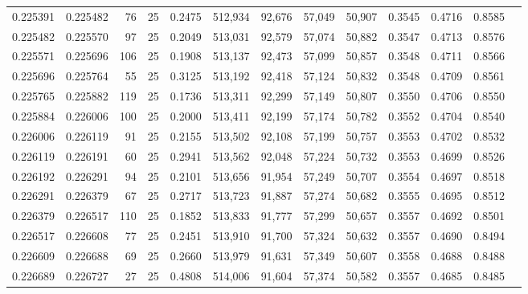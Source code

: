 \begin{tabular}{rrrrrrrrrrrrr}
0.225391 & 0.225482 &    76 &  25 &                                     0.2475 & 512,934 &  92,676 &  57,049 &  50,907 & 0.3545 & 0.4716 & 0.8585 \\
0.225482 & 0.225570 &    97 &  25 &                                     0.2049 & 513,031 &  92,579 &  57,074 &  50,882 & 0.3547 & 0.4713 & 0.8576 \\
0.225571 & 0.225696 &   106 &  25 &                                     0.1908 & 513,137 &  92,473 &  57,099 &  50,857 & 0.3548 & 0.4711 & 0.8566 \\
0.225696 & 0.225764 &    55 &  25 &                                     0.3125 & 513,192 &  92,418 &  57,124 &  50,832 & 0.3548 & 0.4709 & 0.8561 \\
0.225765 & 0.225882 &   119 &  25 &                                     0.1736 & 513,311 &  92,299 &  57,149 &  50,807 & 0.3550 & 0.4706 & 0.8550 \\
0.225884 & 0.226006 &   100 &  25 &                                     0.2000 & 513,411 &  92,199 &  57,174 &  50,782 & 0.3552 & 0.4704 & 0.8540 \\
0.226006 & 0.226119 &    91 &  25 &                                     0.2155 & 513,502 &  92,108 &  57,199 &  50,757 & 0.3553 & 0.4702 & 0.8532 \\
0.226119 & 0.226191 &    60 &  25 &                                     0.2941 & 513,562 &  92,048 &  57,224 &  50,732 & 0.3553 & 0.4699 & 0.8526 \\
0.226192 & 0.226291 &    94 &  25 &                                     0.2101 & 513,656 &  91,954 &  57,249 &  50,707 & 0.3554 & 0.4697 & 0.8518 \\
0.226291 & 0.226379 &    67 &  25 &                                     0.2717 & 513,723 &  91,887 &  57,274 &  50,682 & 0.3555 & 0.4695 & 0.8512 \\
0.226379 & 0.226517 &   110 &  25 &                                     0.1852 & 513,833 &  91,777 &  57,299 &  50,657 & 0.3557 & 0.4692 & 0.8501 \\
0.226517 & 0.226608 &    77 &  25 &                                     0.2451 & 513,910 &  91,700 &  57,324 &  50,632 & 0.3557 & 0.4690 & 0.8494 \\
0.226609 & 0.226688 &    69 &  25 &                                     0.2660 & 513,979 &  91,631 &  57,349 &  50,607 & 0.3558 & 0.4688 & 0.8488 \\
0.226689 & 0.226727 &    27 &  25 &                                     0.4808 & 514,006 &  91,604 &  57,374 &  50,582 & 0.3557 & 0.4685 & 0.8485 \\

\end{tabular}
